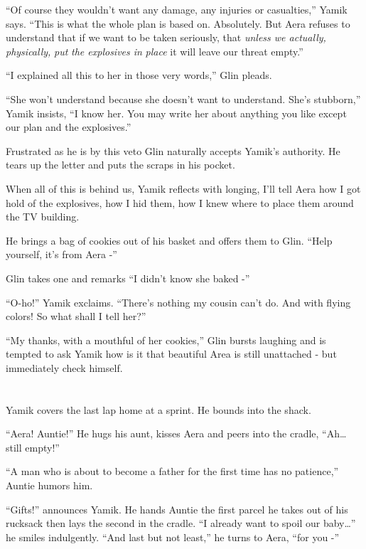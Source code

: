 \documentclass[twoside,11pt]{book}
\begin{document}
``Of course they wouldn't want any damage, any injuries or casualties,'' Yamik says.
``This is what the whole plan is based on. Absolutely. But Aera refuses to understand that if we want to
be taken seriously, that \textit{unless we actually, physically,} \textit{put} \textit{the explosives in} \textit{place
}it will leave our threat empty.''

``I explained all this to her in those very words,'' Glin pleads.

``She won't understand because she doesn't want to understand. She's stubborn,'' Yamik insists, ``I know
her. You may write her about anything you like except our plan and the explosives.''

Frustrated as he is by this veto Glin naturally accepts Yamik's authority. He tears up the letter and puts the scraps in
his pocket.

When all of this is behind us, Yamik reflects with longing, I'll tell Aera how I got hold of the explosives, how I hid
them, how I knew where to place them around the TV building.

He brings a bag of cookies out of his basket and offers them to Glin. ``Help yourself, it's from Aera
-''

Glin takes one and remarks ``I didn't know she baked -''

``O-ho!'' Yamik exclaims. ``There's nothing my cousin can't do. And with flying
colors! So what shall I tell her?''

``My thanks, with a mouthful of her cookies,'' Glin bursts laughing and is tempted to ask
Yamik how is it that beautiful Area is still unattached - but immediately check himself.



\chapter{}

Yamik covers the last lap home at a sprint. He bounds into the shack.

``Aera! Auntie!'' He hugs his aunt, kisses Aera and peers into the cradle,
``Ah{\dots} still empty!''

``A man who is about to become a father for the first time has no patience,'' Auntie humors
him.

``Gifts!'' announces Yamik. He hands Auntie the first parcel he takes out of his rucksack then
lays the second in the cradle. ``I already want to spoil our baby{\dots}'' he smiles indulgently. ``And
last but not least,'' he turns to Aera, ``for you -''
\end{document}
